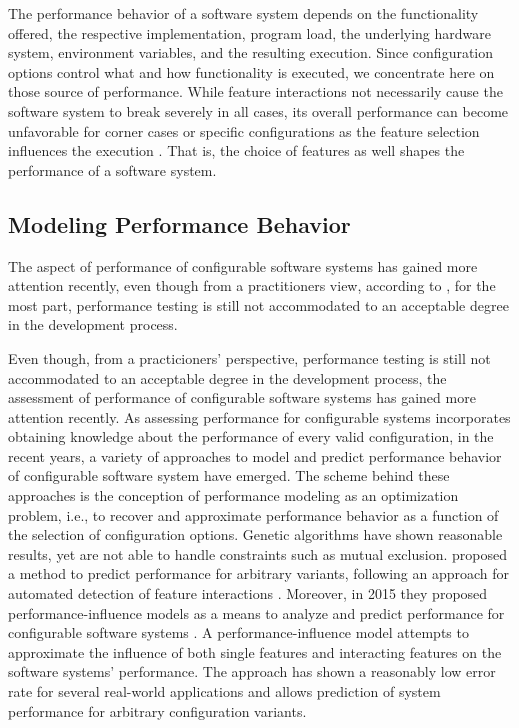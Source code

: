 The performance behavior of a software system depends on the functionality
offered, the respective implementation, program load, the underlying hardware system,
environment variables, and the resulting execution. Since configuration options
control what and how functionality is executed, we concentrate here on those
source of performance. While feature interactions not necessarily cause the
software system to break severely in all cases, its overall performance can
become unfavorable for corner cases or specific configurations as the feature
selection influences the execution \citep{foo_mining_2010,heger_automated_2013,nguyen_industrial_2014}. 
That is, the choice of features as well shapes the performance of a software system.

\subsection{Modeling Performance Behavior}

The aspect of performance of configurable software systems has gained more
attention recently, even though from a practitioners view, according to
\cite{molyneaux_art_2014}, for the most part, performance testing is still not
accommodated to an acceptable degree in the development process.

Even though, from a practicioners' perspective, performance testing is still not
accommodated to an acceptable degree in the development process, the assessment
of performance of configurable software systems has gained more attention
recently. As assessing performance for configurable systems incorporates
obtaining knowledge about the performance of every valid configuration, in the
recent years, a variety of approaches to model and predict performance
behavior of configurable software system have emerged. The scheme behind these
approaches is the conception of performance modeling as an optimization
problem, i.e., to recover and approximate performance behavior as a function of
the selection of configuration options.
Genetic algorithms \citep{guo_genetic_2011,sayyad_scalable_2013}  have shown
reasonable results, yet are not able to handle constraints such as mutual
exclusion.
\cite{siegmund_predicting_2012} proposed a method to predict performance for
arbitrary variants, following an approach for automated detection of feature interactions \citep{siegmund_predicting_2012}.
Moreover, in 2015 they proposed performance-influence models as a means
to analyze and predict performance for configurable software systems
\citep{siegmund_performance-influence_2015}. A performance-influence model
attempts to approximate the influence of both single features and interacting
features on the software systems' performance.
The approach has shown a reasonably low error rate for several real-world
applications and allows prediction of system performance for arbitrary
configuration variants.

